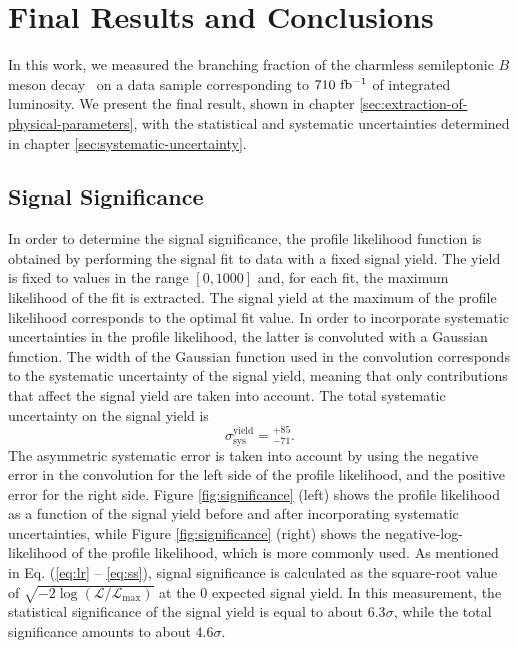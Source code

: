 \chapter{Final Results and Conclusions}\label{sec:results}

In this work, we measured the branching fraction of the charmless semileptonic $B$ meson decay \decayb~on a data sample corresponding to $710\mathrm{~fb^{-1}}$ of integrated luminosity. We present the final result, shown in chapter \ref{sec:extraction-of-physical-parameters}, with the statistical and systematic uncertainties determined in chapter \ref{sec:systematic-uncertainty}.

\section{Signal Significance}

In order to determine the signal significance, the profile likelihood function is obtained by performing the signal fit to data with a fixed signal yield. The yield is fixed to values in the range $[0, 1000]$ and, for each fit, the maximum likelihood of the fit is extracted. The signal yield at the maximum of the profile likelihood corresponds to the optimal fit value. In order to incorporate systematic uncertainties in the profile likelihood, the latter is convoluted with a Gaussian function. The width of the Gaussian function used in the convolution corresponds to the systematic uncertainty of the signal yield, meaning that only contributions that affect the signal yield are taken into account. The total systematic uncertainty on the signal yield is
\begin{equation}
\sigma_{\mathrm{sys}}^{\mathrm{yield}} = {}_{-71}^{+85}.
\end{equation}
The asymmetric systematic error is taken into account by using the negative error in the convolution for the left side of the profile likelihood, and the positive error for the right side. Figure \ref{fig:significance} (left) shows the profile likelihood as a function of the signal yield before and after incorporating systematic uncertainties, while Figure \ref{fig:significance} (right) shows the negative-log-likelihood of the profile likelihood, which is more commonly used. As mentioned in Eq. (\ref{eq:lr} -- \ref{eq:ss}), signal significance is calculated as the square-root value of $\sqrt{-2\log(\mathcal{L}/\mathcal{L}_{\mathrm{max}})}$ at the $0$ expected signal yield. In this measurement, the statistical significance of the signal yield is equal to about $6.3\sigma$, while the total significance amounts to about $4.6\sigma$.

